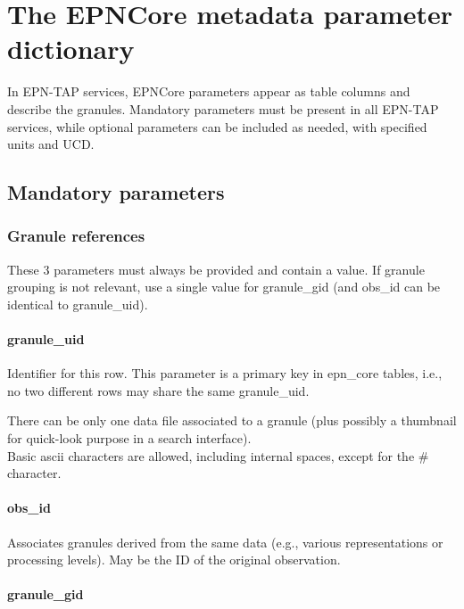 \documentclass[11pt,a4paper]{ivoa}
\begin{document}
\section{The EPNCore metadata parameter dictionary}
\label{sect:dictionary}


In EPN-TAP services, EPNCore parameters appear as table columns and describe the granules.
Mandatory parameters must be present in all EPN-TAP services, while optional
parameters can be included as needed, with specified units and UCD.

\subsection{Mandatory parameters}

\subsubsection{Granule references}

These 3 parameters must always be provided and contain a value. If granule grouping is not
relevant, use a single value for granule\_gid (and obs\_id can be
identical to granule\_uid).

\paragraph{granule\_uid}

Identifier for this row. This parameter is a primary key in epn\_core
tables, i.e., no two different rows may share the same granule\_uid.

There can be only one data file associated to a granule (plus possibly a
thumbnail for quick-look purpose in a search interface).\\
Basic ascii characters are allowed, including internal spaces, except for the \# character.


\paragraph{obs\_id}

Associates granules derived from the same data (e.g., various
representations or processing levels). May be the ID of the original
observation.

\paragraph{granule\_gid}
\end{document}
